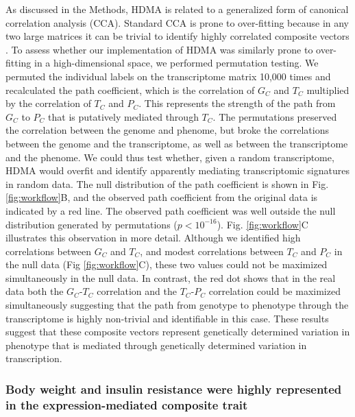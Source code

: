 \documentclass[
]{article}
\begin{document}
As discussed in the Methods, HDMA is related to a generalized form of
canonical correlation analysis (CCA). Standard CCA is prone to
over-fitting because in any two large matrices it can be trivial to
identify highly correlated composite vectors \cite{pmid38383808}. To
assess whether our implementation of HDMA was similarly prone to
over-fitting in a high-dimensional space, we performed permutation
testing. We permuted the individual labels on the transcriptome matrix
10,000 times and recalculated the path coefficient, which is the
correlation of \(G_C\) and \(T_C\) multiplied by the correlation of
\(T_C\) and \(P_C\). This represents the strength of the path from
\(G_C\) to \(P_C\) that is putatively mediated through \(T_C\). The
permutations preserved the correlation between the genome and phenome,
but broke the correlations between the genome and the transcriptome, as
well as between the transcriptome and the phenome. We could thus test
whether, given a random transcriptome, HDMA would overfit and identify
apparently mediating transcriptomic signatures in random data. The null
distribution of the path coefficient is shown in Fig.
\ref{fig:workflow}B, and the observed path coefficient from the original
data is indicated by a red line. The observed path coefficient was well
outside the null distribution generated by permutations
(\(p < 10^{-16}\)). Fig. \ref{fig:workflow}C illustrates this
observation in more detail. Although we identified high correlations
between \(G_C\) and \(T_C\), and modest correlations between \(T_C\) and
\(P_C\) in the null data (Fig \ref{fig:workflow}C), these two values
could not be maximized simultaneously in the null data. In contrast, the
red dot shows that in the real data both the \(G_C\)-\(T_C\) correlation
and the \(T_C\)-\(P_C\) correlation could be maximized simultaneously
suggesting that the path from genotype to phenotype through the
transcriptome is highly non-trivial and identifiable in this case. These
results suggest that these composite vectors represent genetically
determined variation in phenotype that is mediated through genetically
determined variation in transcription.

\subsubsection{Body weight and insulin resistance were highly
represented in the expression-mediated composite
trait}\label{body-weight-and-insulin-resistance-were-highly-represented-in-the-expression-mediated-composite-trait}
\end{document}
